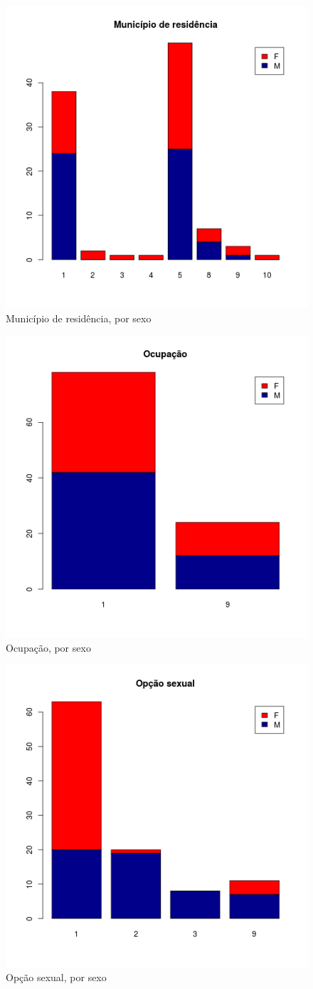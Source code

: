 \documentclass[a4paper]{article}
\begin{document}
\begin{figure}[!h]
  \centering
  \includegraphics[width=.5\textwidth]{../figuras/muni_res-barplot}
  \caption{Município de residência, por sexo}
  \label{fig:muni_res-barplot}
\end{figure}

\begin{figure}[!h]
  \centering
  \includegraphics[width=.5\textwidth]{../figuras/ocupac-barplot}
  \caption{Ocupação, por sexo}
  \label{fig:ocupac-barplot}
\end{figure}

\begin{figure}[!h]
  \centering
  \includegraphics[width=.5\textwidth]{../figuras/opc_sex-barplot}
  \caption{Opção sexual, por sexo}
  \label{fig:opc_sex-barplot}
\end{figure}
\end{document}
